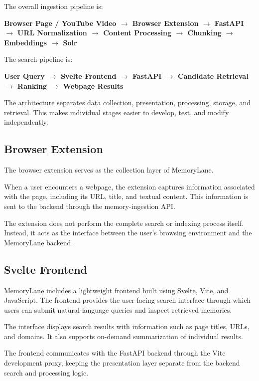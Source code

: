 \documentclass{tietreport}
\begin{document}
The overall ingestion pipeline is:

\begin{center}
\textbf{
Browser Page / YouTube Video
$\rightarrow$
Browser Extension
$\rightarrow$
FastAPI
$\rightarrow$
URL Normalization
$\rightarrow$
Content Processing
$\rightarrow$
Chunking
$\rightarrow$
Embeddings
$\rightarrow$
Solr
}
\end{center}

The search pipeline is:

\begin{center}
\textbf{
User Query
$\rightarrow$
Svelte Frontend
$\rightarrow$
FastAPI
$\rightarrow$
Candidate Retrieval
$\rightarrow$
Ranking
$\rightarrow$
Webpage Results
}
\end{center}

The architecture separates data collection, presentation,
processing, storage, and retrieval. This makes individual
stages easier to develop, test, and modify independently.

\subsection{Browser Extension}

The browser extension serves as the collection layer of
MemoryLane.

When a user encounters a webpage, the extension captures
information associated with the page, including its URL, title,
and textual content. This information is sent to the backend
through the memory-ingestion API.

The extension does not perform the complete search or indexing
process itself. Instead, it acts as the interface between the
user's browsing environment and the MemoryLane backend.

\subsection{Svelte Frontend}

MemoryLane includes a lightweight frontend built using Svelte,
Vite, and JavaScript. The frontend provides the user-facing search
interface through which users can submit natural-language queries
and inspect retrieved memories.

The interface displays search results with information such as
page titles, URLs, and domains. It also supports on-demand
summarization of individual results.

The frontend communicates with the FastAPI backend through the
Vite development proxy, keeping the presentation layer separate
from the backend search and processing logic.
\end{document}
